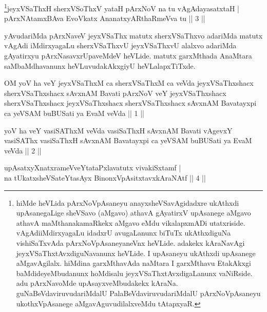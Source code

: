\begin{shl}
\footnote{hiMde heVLida pArxNoVpAsaneyu anayxsheVSavAgidadxre 
ukAthxdi upAsanegaLige sheVSavo (aMgavo) athavA gAyatirxV upAsanege 
aMgavo athavA maMthanakamaRkekx aMgavo eMdu vikalapxmADi 
utatxriside. vAgAdiiMdirxyagaLu idadxrU avugaLanunx biTuTx ukAthxdiguNa vishiSaTxvAda pArxNoVpAsaneyaneVnx heVLide. adakekx kAraNavAgi jeyxVSaThxtAvxdiguNavanunx heVLide. I upAsaneyu ukAthxdi upAsanege 
aMgavAgilalx. hiMdina garxMthavAda naMtara I garxMthavu EtakAkxgi 
baMdideyeMbudanunx hoMdisalu jeyxVSaThxtAvxdigaLanunx vaNiRside. adu 
pArxNavoMde upAsayxveMbudakekx kAraNa. guNaBeVdaviruvudariMdalU 
PalaBeVdaviruvudariMdalU pArxNoVpAsaneyu ukothxVpAsanege 
aMgavAguvudilalxveMdu tAtapxyaR.}jeyxVSaThxH sherxVSoThxV yataH pArxNoV na tu vAgAdayasatxtaH | \\
pArxNAtamxBAva EvoVkatx AnanatxyARthaRmeVva tu \hfill|| 3 || 
\end{shl}

\begin{artha} 
yAvudariMda pArxNaveV jeyxVSaThx matutx sherxVSaThxvo adariMda matutx 
vAgAdi iMdirxyagaLu sherxVSaThxvU jeyxVSaThxvU alalxvo adariMda 
gAyatirxyu pArxNasavxrUpaveMdeV heVLide. matutx garxMthada AnaMtara 
saMbaMdhavanunx heVLuvudakAkxgiyU heVLalapxTiTxde.
\end{artha}

\begin{kandikeshl}
OM yoV ha veY jeyxVSaThxM ca sherxVSaThxM ca veVda jeyxVSaThxshacx sherxVSaThxshacx sAvxnAM Bavati pArxNoV veY jeyxVSaThxshacx sherxVSaThxshacx jeyxVSaThxshacx sherxVSaThxshacx sAvxnAM Bavatayxpi ca yeVSAM buBUSati ya EvaM veVda || 1 ||
\end{kandikeshl}

\begin{kandikeshl}
yoV ha veY vasiSAThxM veVda vasiSaThxH sAvxnAM Bavati vAgevxY vasiSAThx vasiSaThxH sAvxnAM Bavatayxpi ca yeVSAM buBUSati ya EvaM veVda || 2 ||
\end{kandikeshl}

\begin{shl}
upAsatxyXnatxrameVveYtataPxlavatutx vivakiSxtamf | \\
na tUkatxsheVSateYtasAyx BinonxVpAsitxtavxkAraNAtf \hfill|| 4 || 
\end{shl}

